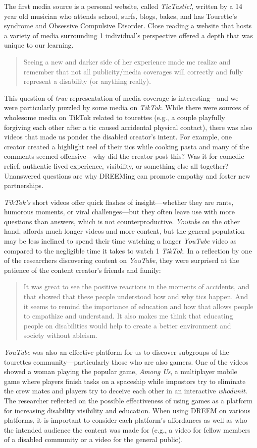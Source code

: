 The first media source is a personal website, called \textit{TicTastic!}, written by a 14 year old musician who attends school, surfs, blogs, bakes, and has Tourette's syndrome and Obsessive Compulsive Disorder. Close reading a website that hosts a variety of media surrounding 1 individual's perspective offered a depth that was unique to our learning.
\begin{quote}
Seeing a new and darker side of her experience made me realize and remember that not all publicity/media coverages will correctly and fully represent a disability (or anything really).
\end{quote}
This question of \textit{true} representation of media coverage is interesting—and we were particularly puzzled by some media on \textit{TikTok}. While there were sources of wholesome media on TikTok related to tourettes (e.g., a couple playfully forgiving each other after a tic caused accidental physical contact), there was also videos that made us ponder the disabled creator's intent. For example, one creator created a highlight reel of their tics while cooking pasta and many of the comments seemed offensive—why did the creator post this? Was it for comedic relief, authentic lived experience, visibility, or something else all together? Unanswered questions are why DREEMing can promote empathy and foster new partnerships. 

\textit{TikTok's} short videos offer quick flashes of insight—whether they are rants, humorous moments, or viral challenges—but they often leave use with more questions than answers, which is not counterproductive. \textit{Youtube} on the other hand, affords much longer videos and more content, but the general population may be less inclined to spend their time watching a longer \textit{YouTube} video as compared to the negligible time it takes to watch 1 \textit{TikTok}. In a reflection by one of the researchers discovering content on \textit{YouTube}, they were surprised at the patience of the content creator's friends and family:
\begin{quote}
It was great to see the positive reactions in the moments of accidents, and that showed that these people understood how and why tics happen. And it seems to remind the importance of education and how that allows people to empathize and understand. It also makes me think that educating people on disabilities would help to create a better environment and society without ableism. 
\end{quote}
\textit{YouTube} was also an effective platform for us to discover subgroups of the tourettes community—particularly those who are also gamers. One of the videos showed a woman playing the popular game, \textit{Among Us}, a multiplayer mobile game where players finish tasks on a spaceship while impostors try to eliminate the crew mates and players try to deceive each other in an interactive \textit{whodunit}. The researcher reflected on the possible effectiveness of using games as a platform for increasing disability visibility and education. When using DREEM on various platforms, it is important to consider each platform's affordances as well as who the intended audience the content was made for (e.g., a video for fellow members of a disabled community or a video for the general public). 

